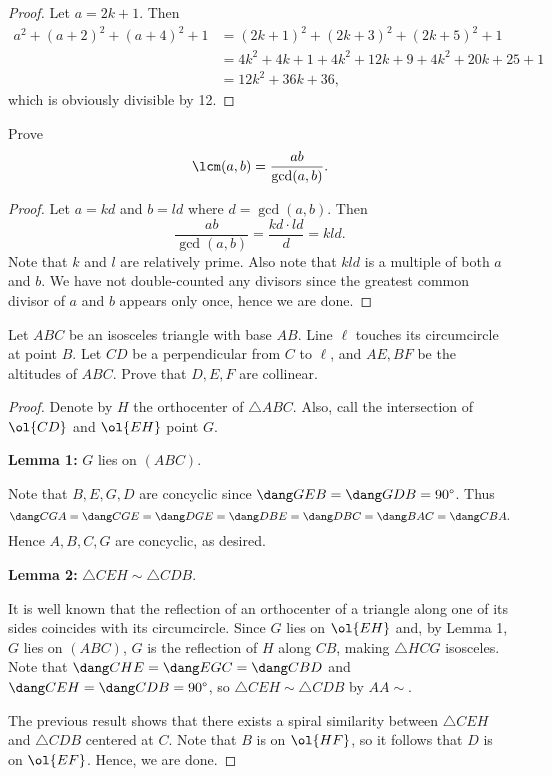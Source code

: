 \documentclass[letterpaper,oneside]{scrartcl}
\begin{document}
\begin{proof}
  Let \(a=2k+1.\) Then
  \begin{align*}
    a^2+(a+2)^2+(a+4)^2+1 & = (2k+1)^2+(2k+3)^2+(2k+5)^2+1       \\
                          & = 4k^2+4k+1+4k^2+12k+9+4k^2+20k+25+1 \\
                          & = 12k^2+36k+36,
  \end{align*}
  which is obviously divisible by 12.
\end{proof}
\begin{problem*}
  Prove \[\lcm(a,b)=\frac{ab}{\gcd(a,b)}.\]
\end{problem*}
\begin{proof}
  Let \(a=kd\) and \(b=ld\) where \(d=\gcd(a,b).\) Then
  \[\frac{ab}{\gcd(a,b)}=\frac{kd\cdot ld}{d}=kld.\]
  Note that \(k\) and \(l\) are relatively prime. Also note that \(kld\) is a multiple of both \(a\) and \(b\). We have not double-counted any divisors since the greatest common divisor of \(a\) and \(b\) appears only once, hence we are done.
\end{proof}
\begin{problem*}
  Let \(ABC\) be an isosceles triangle with base \(AB\). Line \(\ell\) touches its circumcircle at point \(B\). Let \(CD\) be a perpendicular from \(C\) to \(\ell\), and \(AE, BF\) be the altitudes of \(ABC\). Prove that \(D,E,F\) are collinear.
\end{problem*}
\begin{proof}
  Denote by \(H\) the orthocenter of \(\triangle ABC\). Also, call the intersection of \(\ol{CD}\) and \(\ol{EH}\) point \(G.\)

  \textbf{Lemma 1:} \(G\) lies on \((ABC)\).

  \begin{subproof}
    Note that \(B,E,G,D\) are concyclic since \(\dang GEB = \dang GDB = 90\degree\). Thus
    \[\dang CGA = \dang CGE = \dang DGE = \dang DBE = \dang DBC = \dang BAC = \dang CBA.\]
    Hence \(A,B,C,G\) are concyclic, as desired.
  \end{subproof}

  \textbf{Lemma 2:} \(\triangle CEH \sim \triangle CDB.\)

  \begin{subproof}
    It is well known that the reflection of an orthocenter of a triangle along one of its sides coincides with its circumcircle. Since \(G\) lies on \(\ol{EH}\) and, by Lemma 1, \(G\) lies on \((ABC)\), \(G\) is the reflection of \(H\) along \(CB\), making \(\triangle HCG\) isosceles. Note that \(\dang CHE = \dang EGC = \dang CBD\) and \(\dang CEH = \dang CDB = 90\degree\), so \(\triangle CEH \sim \triangle CDB\) by \(AA\sim\).
  \end{subproof}

  The previous result shows that there exists a spiral similarity between \(\triangle CEH\) and \(\triangle CDB\) centered at \(C\). Note that \(B\) is on \(\ol{HF}\), so it follows that \(D\) is on \(\ol{EF}\). Hence, we are done.
\end{proof}
\end{document}

